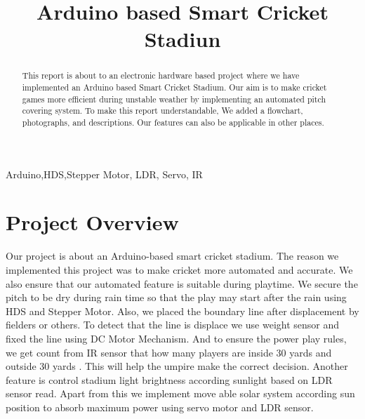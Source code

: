 \documentclass[conference]{IEEEtran}
\begin{document}
\title{Arduino based Smart Cricket Stadiun}

\author{
}

\maketitle


\begin{abstract}
This report is about to an electronic hardware based project where we have implemented an Arduino based Smart Cricket Stadium. 
Our aim is to make cricket games more efficient during unstable weather by implementing an automated pitch covering system. To make this report understandable,
We added a flowchart, photographs, and descriptions. Our features can also be applicable in other places.
\end{abstract}

\begin{IEEEkeywords}
 Arduino,HDS,Stepper Motor, LDR, Servo, IR
\end{IEEEkeywords}


\section{Project Overview }
Our project is about an Arduino-based smart cricket stadium. The reason we implemented this project was to make cricket more automated and accurate. We also ensure that our automated feature is suitable during playtime. We secure the pitch to be dry during rain time so that the play may start after the rain using HDS and Stepper Motor. Also, we placed the boundary line after displacement by fielders or others. To  detect that the line is displace we use weight sensor and fixed the line using DC Motor Mechanism. And to ensure the power play rules, we get count from IR sensor that how many players are inside 30 yards and outside 30 yards . This will help the umpire make the correct decision. Another feature is control stadium light brightness according sunlight based on LDR sensor read. Apart from this we implement move able solar system according sun position to absorb maximum power using servo motor and LDR sensor.
\end{document}
